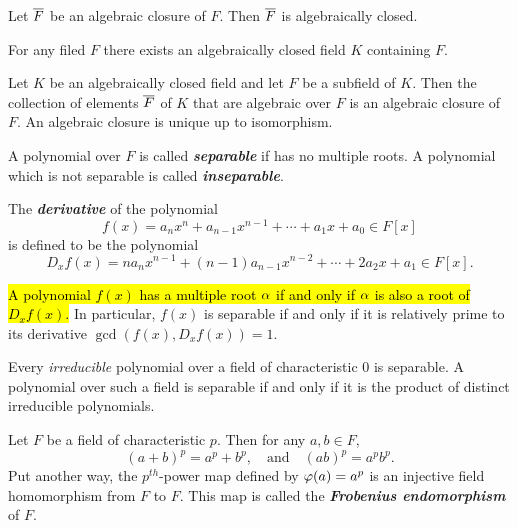 \nl

\begin{prop}
Let $\overline F$ be an algebraic closure of $F$. Then $\overline F$ is algebraically closed.
\end{prop}

\nl

\begin{prop}
For any filed $F$ there exists an algebraically closed field $K$ containing $F$.
\end{prop}

\nl

\begin{prop}
Let $K$ be an algebraically closed field and let $F$ be a subfield of $K$. Then the collection of elements $\overline F$ of $K$ that are algebraic over $F$ is an algebraic closure of $F$. An algebraic closure is unique up to isomorphism.
\end{prop}

\nl

\begin{defn}
A polynomial over $F$ is called \textit{\textbf{separable}} if has no multiple roots. A polynomial which is not separable is called \textit{\textbf{inseparable}}.
\end{defn}

\nl

\begin{defn}
The \textit{\textbf{derivative}} of the polynomial
\[f(x) = a_nx^n + a_{n - 1}x^{n - 1} + \cdots + a_1x + a_0\in F[x]\]
is defined to be the polynomial
\[D_xf(x) = na_n x^{n - 1} + (n - 1)a_{n - 1}x^{n - 2} + \cdots + 2a_2x + a_1 \in F[x].\]
\end{defn}

\nl

\begin{prop}
\hl{A polynomial $f(x)$ has a multiple root $\alpha$ if and only if $\alpha$ is also a root of $D_xf(x)$.} In particular, $f(x)$ is separable if and only if it is relatively prime to its derivative $\gcd(f(x), D_xf(x)) = 1$.
\end{prop}

\nl

\begin{cor}
Every \textit{irreducible} polynomial over a field of characteristic 0 is separable. A polynomial over such a field is separable if and only if it is the product of distinct irreducible polynomials.
\end{cor}

\nl

\begin{prop}
Let $F$ be a field of characteristic $p$. Then for any $a,b\in F$,
\[(a + b)^p = a^p + b^p,\quad\text{and}\quad(ab)^p = a^pb^p.\]
Put another way, the $p^{th}$-power map defined by $\varphi(a) = a^p$ is an injective field homomorphism from $F$ to $F$. This map is called the \textit{\textbf{Frobenius endomorphism}} of $F$.
\end{prop}


